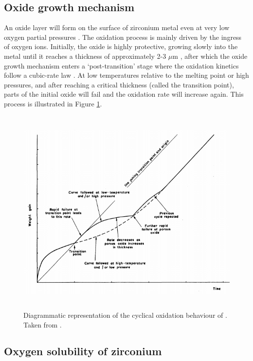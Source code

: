 \subsection{Oxide growth mechanism}

An oxide layer will form on the surface of zirconium metal even at very low oxygen partial pressures \cite{causey2005review}. The oxidation process is mainly driven by the ingress of oxygen ions. Initially, the oxide is highly protective, growing slowly into the metal until it reaches a thickness of approximately 2-3 $\mu$m \cite{garzarolli1991oxide, dawson1968kinetics}, after which the oxide growth mechanism enters a `post-transition' stage where the oxidation kinetics follow a cubic-rate law  \cite{porte1960oxidation}. At low temperatures relative to the melting point or high pressures, and after reaching a critical thickness (called the transition point), parts of the initial oxide will fail and the oxidation rate will increase again. This process is illustrated in Figure \ref{figure:oxide_weight_gain}. 

\begin{figure}[ht]
\centering
\includegraphics[height=10.5cm]{images/zro2_oxide_weight_gain.png}
\caption[Diagrammatic representation of the cyclical oxidation behaviour of \zirconia .]{Diagrammatic representation of the cyclical oxidation behaviour of \zirconia . Taken from \cite{cox1963some}.}
\label{figure:oxide_weight_gain}
\end{figure}

\subsection{Oxygen solubility of zirconium} \label{oxygensolubility}

